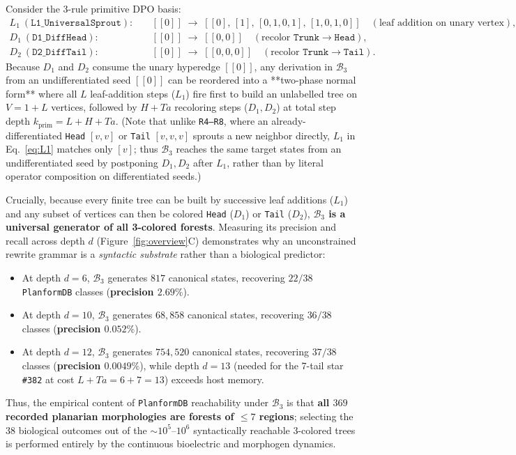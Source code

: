 \documentclass[11pt,a4paper]{article}
\theoremstyle{definition}
\theoremstyle{remark}
\begin{document}
Consider the 3-rule primitive DPO basis:
\begin{align}
  L_1\ (\texttt{L1\_UniversalSprout}): &\quad [[0]] \;\longrightarrow\; [[0],\, [1],\, [0,1,0,1],\, [1,0,1,0]] \quad (\text{leaf addition on unary vertex}), \label{eq:L1}\\
  D_1\ (\texttt{D1\_DiffHead}): &\quad [[0]] \;\longrightarrow\; [[0, 0]] \quad (\text{recolor } \mathtt{Trunk} \to \mathtt{Head}), \label{eq:D1}\\
  D_2\ (\texttt{D2\_DiffTail}): &\quad [[0]] \;\longrightarrow\; [[0, 0, 0]] \quad (\text{recolor } \mathtt{Trunk} \to \mathtt{Tail}). \label{eq:D2}
\end{align}
Because $D_1$ and $D_2$ consume the unary hyperedge $[[0]]$, any derivation in $\mathcal{B}_3$ from an undifferentiated seed $[[0]]$ can be reordered into a **two-phase normal form** where all $L$ leaf-addition steps ($L_1$) fire first to build an unlabelled tree on $V = 1 + L$ vertices, followed by $H + Ta$ recoloring steps ($D_1, D_2$) at total step depth $k_{\text{prim}} = L + H + Ta$. (Note that unlike \texttt{R4--R8}, where an already-differentiated \texttt{Head} $[v,v]$ or \texttt{Tail} $[v,v,v]$ sprouts a new neighbor directly, $L_1$ in Eq.~\eqref{eq:L1} matches only $[v]$; thus $\mathcal{B}_3$ reaches the same target states from an undifferentiated seed by postponing $D_1, D_2$ after $L_1$, rather than by literal operator composition on differentiated seeds.)

Crucially, because every finite tree can be built by successive leaf additions ($L_1$) and any subset of vertices can then be colored \texttt{Head} ($D_1$) or \texttt{Tail} ($D_2$), \textbf{$\mathcal{B}_3$ is a universal generator of all 3-colored forests}. Measuring its precision and recall across depth $d$ (Figure~\ref{fig:overview}C) demonstrates why an unconstrained rewrite grammar is a \emph{syntactic substrate} rather than a biological predictor:
\begin{itemize}
  \item At depth $d = 6$, $\mathcal{B}_3$ generates $817$ canonical states, recovering $22/38$ \texttt{PlanformDB} classes (\textbf{precision $2.69\%$}).
  \item At depth $d = 10$, $\mathcal{B}_3$ generates $68{,}858$ canonical states, recovering $36/38$ classes (\textbf{precision $0.052\%$}).
  \item At depth $d = 12$, $\mathcal{B}_3$ generates $754{,}520$ canonical states, recovering $37/38$ classes (\textbf{precision $0.0049\%$}), while depth $d = 13$ (needed for the 7-tail star \texttt{\#382} at cost $L + Ta = 6 + 7 = 13$) exceeds host memory.
\end{itemize}
Thus, the empirical content of \texttt{PlanformDB} reachability under $\mathcal{B}_3$ is that \textbf{all $369$ recorded planarian morphologies are forests of $\le 7$ regions}; selecting the $38$ biological outcomes out of the $\sim 10^5\text{--}10^6$ syntactically reachable 3-colored trees is performed entirely by the continuous bioelectric and morphogen dynamics.
\end{document}
